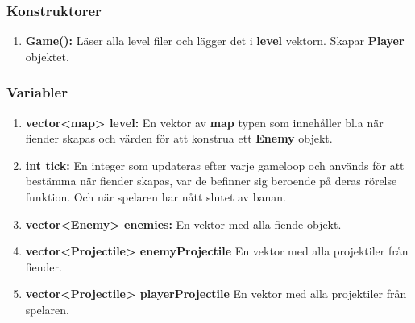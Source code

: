 \documentclass{TDP005mall}
\begin{document}
 \subsubsection*{Konstruktorer}
 \begin{enumerate}
   \item \textbf{Game():} Läser alla level filer och lägger det i \textbf{level} vektorn. 
                          Skapar \textbf{Player} objektet.
 \end{enumerate}
 \subsubsection*{Variabler}
 \begin{enumerate}
   \item \textbf{vector<map> level:} En vektor av \textbf{map} typen som innehåller bl.a när fiender skapas och värden för att konstrua ett \textbf{Enemy} objekt.
   \item \textbf{int tick:} En integer som updateras efter varje gameloop och används för att bestämma när fiender skapas, var de befinner sig beroende på deras rörelse funktion.
                            Och när spelaren har nått slutet av banan.
    \item \textbf{vector<Enemy> enemies: } En vektor med alla fiende objekt.
    \item \textbf{vector<Projectile> enemyProjectile} En vektor med alla projektiler från fiender.
    \item \textbf{vector<Projectile> playerProjectile} En vektor med alla projektiler från spelaren.
 \end{enumerate}
\end{document}
